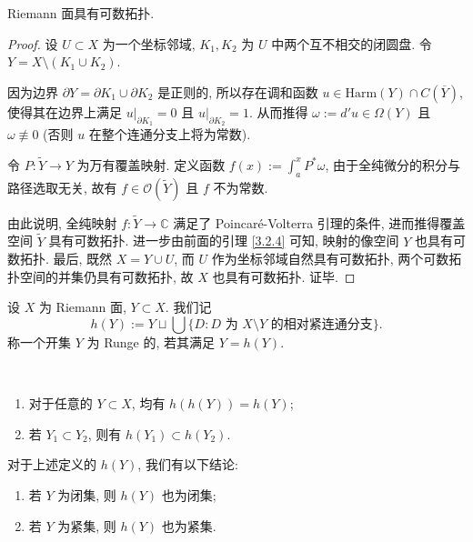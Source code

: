 \begin{theorem}[Rad\'o]
Riemann 面具有可数拓扑.
\end{theorem}

\begin{proof}
设 $U \subset X$ 为一个坐标邻域, $K_1, K_2$ 为 $U$ 中两个互不相交的闭圆盘. 令 $Y = X \setminus (K_1 \cup K_2)$. 

因为边界 $\partial Y = \partial K_1 \cup \partial K_2$ 是正则的, 所以存在调和函数 $u \in \mathrm{Harm}(Y) \cap C(\overline{Y})$, 使得其在边界上满足 $u|_{\partial K_1} = 0$ 且 $u|_{\partial K_2} = 1$. 从而推得 $\omega := d'u \in \Omega(Y)$ 且 $\omega \not\equiv 0$ (否则 $u$ 在整个连通分支上将为常数).

令 $P: \widetilde{Y} \to Y$ 为万有覆盖映射. 定义函数 $f(x) := \int_a^x P^*\omega$, 由于全纯微分的积分与路径选取无关, 故有 $f \in \mathcal{O}(\widetilde{Y})$ 且 $f$ 不为常数.

由此说明, 全纯映射 $f: \widetilde{Y} \to \mathbb{C}$ 满足了 Poincar\'e-Volterra 引理的条件, 进而推得覆盖空间 $\widetilde{Y}$ 具有可数拓扑. 进一步由前面的引理 \ref{3.2.4} 可知, 映射的像空间 $Y$ 也具有可数拓扑. 最后, 既然 $X = Y \cup U$, 而 $U$ 作为坐标邻域自然具有可数拓扑, 两个可数拓扑空间的并集仍具有可数拓扑, 故 $X$ 也具有可数拓扑. 证毕.
\end{proof}


\begin{definition}
设 $X$ 为 Riemann 面, $Y \subset X$. 我们记
\[ h(Y) := Y \sqcup \bigcup \{D : D \text{ 为 } X \setminus Y \text{ 的相对紧连通分支}\}. \]
称一个开集 $Y$ 为 Runge 的, 若其满足 $Y = h(Y)$.
\end{definition}

\begin{proposition}$\ $
    \begin{enumerate}
        \item 对于任意的 $Y \subset X$, 均有 $h(h(Y)) = h(Y)$;
        \item 若 $Y_1 \subset Y_2$, 则有 $h(Y_1) \subset h(Y_2)$.
    \end{enumerate}
\end{proposition}


\begin{theorem}
对于上述定义的 $h(Y)$, 我们有以下结论:
\begin{enumerate}
    \item 若 $Y$ 为闭集, 则 $h(Y)$ 也为闭集;
    \item 若 $Y$ 为紧集, 则 $h(Y)$ 也为紧集.
\end{enumerate}
\end{theorem}

